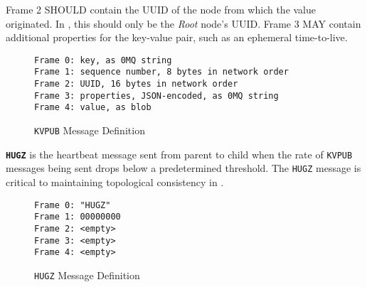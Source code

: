 Frame 2 SHOULD contain the UUID of the node from which the value originated. In \dcampns, this should only be the
\textit{Root} node's UUID. Frame 3 MAY contain additional properties for the key-value pair, such as an ephemeral
time-to-live.

\begin{figure}[H]
\vspace{+10pt}
\begin{verbatim}
Frame 0: key, as 0MQ string
Frame 1: sequence number, 8 bytes in network order
Frame 2: UUID, 16 bytes in network order
Frame 3: properties, JSON-encoded, as 0MQ string
Frame 4: value, as blob
\end{verbatim}
\vspace{-20pt}
\caption{\texttt{KVPUB} Message Definition}
\label{fig:message_kvpub}
\end{figure}

\textbf{\texttt{HUGZ}} is the heartbeat message sent from parent to child when the rate of \texttt{KVPUB} messages being
sent drops below a predetermined threshold. The \texttt{HUGZ} message is critical to maintaining topological consistency
in \dcampns.

\begin{figure}[H]
\vspace{+10pt}
\begin{verbatim}
Frame 0: "HUGZ"
Frame 1: 00000000
Frame 2: <empty>
Frame 3: <empty>
Frame 4: <empty>
\end{verbatim}
\vspace{-20pt}
\caption{\texttt{HUGZ} Message Definition}
\label{fig:message_hugz}
\end{figure}
